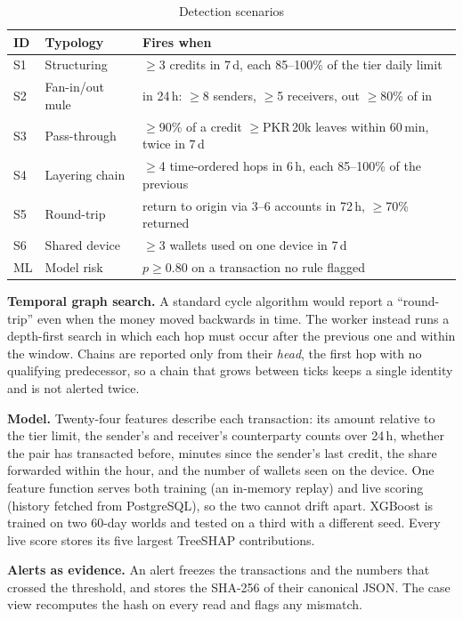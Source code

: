 \documentclass[conference,10pt]{IEEEtran}
\newcommand{\tbl}{\scriptsize\renewcommand{\arraystretch}{1.12}}
\begin{document}
\begin{table}[t]
\caption{Detection scenarios}\label{tab:typ}
\centering\tbl
\begin{tabularx}{\columnwidth}{@{}llL@{}}
\toprule
ID & Typology & Fires when \\ \midrule
S1 & Structuring & $\geq$3 credits in 7\,d, each 85--100\% of the tier daily limit \\
S2 & Fan-in/out mule & in 24\,h: $\geq$8 senders, $\geq$5 receivers, out $\geq$80\% of in \\
S3 & Pass-through & $\geq$90\% of a credit $\geq$PKR\,20k leaves within 60\,min, twice in 7\,d \\
S4 & Layering chain & $\geq$4 time-ordered hops in 6\,h, each 85--100\% of the previous \\
S5 & Round-trip & return to origin via 3--6 accounts in 72\,h, $\geq$70\% returned \\
S6 & Shared device & $\geq$3 wallets used on one device in 7\,d \\
ML & Model risk & $p \geq 0.80$ on a transaction no rule flagged \\
\bottomrule
\end{tabularx}
\end{table}

\textbf{Temporal graph search.} A standard cycle algorithm would report a ``round-trip'' even when
the money moved backwards in time. The worker instead runs a depth-first search in which each hop
must occur after the previous one and within the window. Chains are reported only from their
\emph{head}, the first hop with no qualifying predecessor, so a chain that grows between ticks
keeps a single identity and is not alerted twice.

\textbf{Model.} Twenty-four features describe each transaction: its amount relative to the tier
limit, the sender's and receiver's counterparty counts over 24\,h, whether the pair has transacted
before, minutes since the sender's last credit, the share forwarded within the hour, and the number of
wallets seen on the device. One feature function serves both training (an in-memory replay) and
live scoring (history fetched from PostgreSQL), so the two cannot drift apart. XGBoost is trained
on two 60-day worlds and tested on a third with a different seed. Every live score stores its five
largest TreeSHAP contributions.

\textbf{Alerts as evidence.} An alert freezes the transactions and the numbers that crossed the
threshold, and stores the SHA-256 of their canonical JSON. The case view recomputes the hash on
every read and flags any mismatch.
\end{document}
